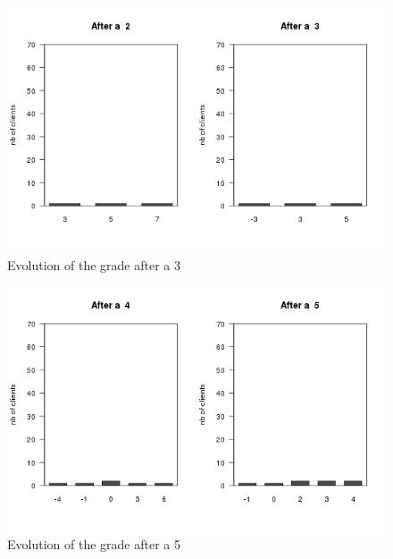 \documentclass[a4paper, 11pt]{article}
\begin{document}
    \begin{figure}[!ht]
            \centering
            \includegraphics[height = 10 cm]{Remi/Evolution_of_the_grade_after_a_3.png}
            \caption{Evolution of the grade after a 3}
            \label{fig:e_3}
    \end{figure}

    \begin{figure}[!ht]
            \centering
            \includegraphics[height = 10 cm]{Remi/Evolution_of_the_grade_after_a_5.png}
            \caption{Evolution of the grade after a 5}
            \label{fig:e_5}
    \end{figure}
\end{document}
